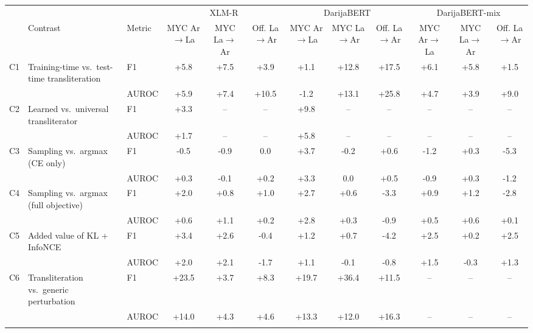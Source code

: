 \begin{lrbox}{\tblbox}\footnotesize\setlength{\tabcolsep}{4pt}%
\begin{tabular}{@{}lllccccccccc@{}}
\toprule
 & & & \multicolumn{3}{c}{XLM-R} & \multicolumn{3}{c}{DarijaBERT} & \multicolumn{3}{c}{DarijaBERT-mix}\\
\cmidrule(lr){4-6}\cmidrule(lr){7-9}\cmidrule(lr){10-12}
& Contrast & Metric & \shortstack{MYC\\Ar$\to$La} & \shortstack{MYC\\La$\to$Ar} & \shortstack{Off.\\La$\to$Ar} & \shortstack{MYC\\Ar$\to$La} & \shortstack{MYC\\La$\to$Ar} & \shortstack{Off.\\La$\to$Ar} & \shortstack{MYC\\Ar$\to$La} & \shortstack{MYC\\La$\to$Ar} & \shortstack{Off.\\La$\to$Ar}\\
\midrule
C1 & Training-time vs.\ test-time transliteration & F1 & +5.8 & +7.5\rlap{$^{*}$} & +3.9 & +1.1 & +12.8\rlap{$^{*}$} & +17.5\rlap{$^{*}$} & +6.1\rlap{$^{*}$} & +5.8\rlap{$^{*}$} & +1.5\\
 & & AUROC & +5.9\rlap{$^{*}$} & +7.4\rlap{$^{*}$} & +10.5\rlap{$^{*}$} & -1.2 & +13.1\rlap{$^{*}$} & +25.8\rlap{$^{*}$} & +4.7\rlap{$^{*}$} & +3.9\rlap{$^{*}$} & +9.0\rlap{$^{*}$}\\
\addlinespace[2pt]
C2 & Learned vs.\ universal transliterator & F1 & +3.3 & -- & -- & +9.8\rlap{$^{*}$} & -- & -- & -- & -- & --\\
 & & AUROC & +1.7 & -- & -- & +5.8\rlap{$^{*}$} & -- & -- & -- & -- & --\\
\addlinespace[2pt]
C3 & Sampling vs.\ argmax (CE only) & F1 & -0.5 & -0.9 & 0.0 & +3.7 & -0.2 & +0.6 & -1.2 & +0.3 & -5.3\rlap{$^{\circ}$}\\
 & & AUROC & +0.3 & -0.1 & +0.2 & +3.3\rlap{$^{*}$} & 0.0 & +0.5 & -0.9 & +0.3 & -1.2\\
\addlinespace[2pt]
C4 & Sampling vs.\ argmax (full objective) & F1 & +2.0 & +0.8 & +1.0 & +2.7 & +0.6 & -3.3 & +0.9 & +1.2 & -2.8\rlap{$^{\circ}$}\\
 & & AUROC & +0.6 & +1.1 & +0.2 & +2.8\rlap{$^{*}$} & +0.3 & -0.9 & +0.5 & +0.6 & +0.1\\
\addlinespace[2pt]
C5 & Added value of KL + InfoNCE & F1 & +3.4 & +2.6\rlap{$^{*}$} & -0.4 & +1.2 & +0.7 & -4.2\rlap{$^{\circ}$} & +2.5 & +0.2 & +2.5\rlap{$^{*}$}\\
 & & AUROC & +2.0 & +2.1 & -1.7 & +1.1 & -0.1 & -0.8 & +1.5 & -0.3 & +1.3\\
\addlinespace[2pt]
C6 & Transliteration vs.\ generic perturbation & F1 & +23.5\rlap{$^{*}$} & +3.7\rlap{$^{*}$} & +8.3\rlap{$^{*}$} & +19.7\rlap{$^{*}$} & +36.4\rlap{$^{*}$} & +11.5\rlap{$^{*}$} & -- & -- & --\\
 & & AUROC & +14.0\rlap{$^{*}$} & +4.3\rlap{$^{*}$} & +4.6 & +13.3\rlap{$^{*}$} & +12.0\rlap{$^{*}$} & +16.3\rlap{$^{*}$} & -- & -- & --\\
\addlinespace[2pt]
\bottomrule
\end{tabular}%
\end{lrbox}

